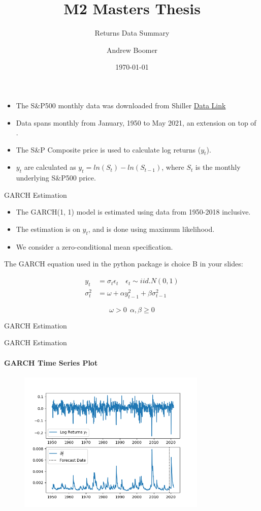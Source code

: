 \documentclass[9pt]{beamer}
\title{M2 Masters Thesis}
\subtitle{Returns Data Summary}
\author{Andrew Boomer}
\date{\today}
\begin{document}
\frame{\titlepage}

\begin{frame}
\begin{itemize}
    \item The S\&P500 monthly data was downloaded from Shiller \href{http://www.econ.yale.edu/~shiller/data.htm}{Data Link}
    \item Data spans monthly from January, 1950 to May 2021, an extension on top of \cite{faias2017optimal}.
    \item The S\&P Composite price is used to calculate log returns ($y_{t}$).
    \item $y_{t}$ are calculated as $y_{t} = ln(S_{t}) - ln(S_{t - 1})$, where $S_{t}$ is the monthly underlying S\&P500 price.
\end{itemize}
\end{frame}

\begin{frame}{GARCH Estimation}
\begin{itemize}
    \item The GARCH(1, 1) model is estimated using data from 1950-2018 inclusive.
    \item The estimation is on $y_{t}$, and is done using maximum likelihood.
    \item We consider a zero-conditional mean specification.
\end{itemize}

The GARCH equation used in the python package is choice B in your slides:

\begin{align}
\nonumber y_{t} &= \sigma_{t} \epsilon_{t} \quad \epsilon_{t} \sim iid.N(0, 1)
\\ \nonumber \sigma_{t}^{2} &= \omega + \alpha y_{t - 1}^{2} + \beta \sigma_{t - 1}^{2}
\end{align}

\[\omega > 0 \ \ \alpha, \beta \geq 0\]
\end{frame}

\begin{frame}{GARCH Estimation}

\end{frame}

\begin{frame}{GARCH Estimation}
\framesubtitle{GARCH Time Series Plot}
\begin{center}
	\begin{figure}
		\includegraphics[width=9cm]{GARCH_TS_plot.png}
	\end{figure}
\end{center}
\end{frame}
\end{document}
